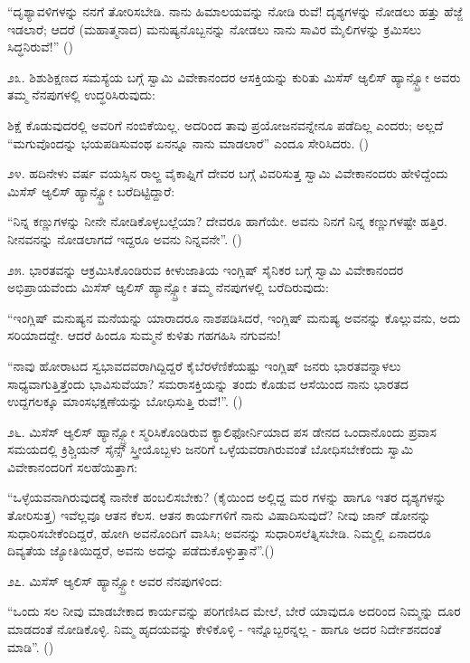 “ದೃಶ್ಯಾವಳಿಗಳನ್ನು ನನಗೆ ತೋರಿಸಬೇಡಿ. ನಾನು ಹಿಮಾಲಯವನ್ನು ನೋಡಿ ರುವೆ! ದೃಶ್ಯಗಳನ್ನು ನೋಡಲು ಹತ್ತು ಹೆಜ್ಜೆ ಇಡಲಾರೆ; ಆದರೆ (ಮಹಾತ್ಮನಾದ) ಮನುಷ್ಯನೊಬ್ಬನನ್ನು ನೋಡಲು ನಾನು ಸಾವಿರ ಮೈಲಿಗಳನ್ನು ಕ್ರಮಿಸಲು ಸಿದ್ಧನಿರುವೆ!” ()

೨೩. ಶಿಶುಶಿಕ್ಷಣದ ಸಮಸ್ಯೆಯ ಬಗ್ಗೆ ಸ್ವಾಮಿ ವಿವೇಕಾನಂದರ ಆಸಕ್ತಿಯನ್ನು ಕುರಿತು ಮಿಸೆಸ್ ಆ್ಯಲಿಸ್ ಹ್ಯಾನ್ಸ್ಬ್ರೋ ಅವರು ತಮ್ಮ ನೆನಪುಗಳಲ್ಲಿ ಉದ್ಧರಿಸಿರುವುದು:

ಶಿಕ್ಷೆ ಕೊಡುವುದರಲ್ಲಿ ಅವರಿಗೆ ನಂಬಿಕೆಯಿಲ್ಲ. ಅದರಿಂದ ತಾವು ಪ್ರಯೋಜನವನ್ನೇನೂ ಪಡೆದಿಲ್ಲ ಎಂದರು; ಅಲ್ಲದೆ “ಮಗುವೊಂದನ್ನು ಭಯಪಡಿಸುವಂಥ ಏನನ್ನೂ ನಾನು ಮಾಡಲಾರೆ” ಎಂದೂ ಸೇರಿಸಿದರು. ()

೨೪. ಹದಿನೇಳು ವರ್ಷ ವಯಸ್ಸಿನ ರಾಲ್ಙ ವೈಕಾಫ್ನಿಗೆ ದೇವರ ಬಗ್ಗೆ ವಿವರಿಸುತ್ತ ಸ್ವಾಮಿ ವಿವೇಕಾನಂದರು ಹೇಳಿದ್ದೆಂದು ಮಿಸೆಸ್ ಆ್ಯಲಿಸ್ ಹ್ಯಾನ್ಸ್ಬ್ರೋ ಬರೆದಿಟ್ಟಿದ್ದಾರೆ:

“ನಿನ್ನ ಕಣ್ಣುಗಳನ್ನು ನೀನೇ ನೋಡಿಕೊಳ್ಳಬಲ್ಲೆಯಾ? ದೇವರೂ ಹಾಗೆಯೇ. ಅವನು ನಿನಗೆ ನಿನ್ನ ಕಣ್ಣುಗಳಷ್ಟೇ ಹತ್ತಿರ. ನೀನವನನ್ನು ನೋಡಲಾಗದೆ ಇದ್ದರೂ ಅವನು ನಿನ್ನವನೇ”. ()

೨೫. ಭಾರತವನ್ನು ಆಕ್ರಮಿಸಿಕೊಂಡಿರುವ ಕೀಳುಜಾತಿಯ ಇಂಗ್ಲಿಷ್ ಸೈನಿಕರ ಬಗ್ಗೆ ಸ್ವಾಮಿ ವಿವೇಕಾನಂದರ ಅಭಿಪ್ರಾಯವೆಂದು ಮಿಸೆಸ್ ಆ್ಯಲಿಸ್ ಹ್ಯಾನ್ಸ್ಬ್ರೋ ತಮ್ಮ ನೆನಪುಗಳಲ್ಲಿ ಬರೆದಿರುವುದು:

“ಇಂಗ್ಲಿಷ್ ಮನುಷ್ಯನ ಮನೆಯನ್ನು ಯಾರಾದರೂ ನಾಶಪಡಿಸಿದರೆ, ಇಂಗ್ಲಿಷ್ ಮನುಷ್ಯ ಅವನನ್ನು ಕೊಲ್ಲುವನು, ಅದು ಸರಿಯಾದದ್ದೇ. ಆದರೆ ಹಿಂದೂ ಸುಮ್ಮನೆ ಕುಳಿತು ಗಹಗಹಿಸಿ ನಗುವನು!

“ನಾವು ಹೋರಾಟದ ಸ್ವಭಾವದವರಾಗಿದ್ದಿದ್ದರೆ ಕೈಬೆರಳೆಣಿಕೆಯಷ್ಟು ಇಂಗ್ಲಿಷ್ ಜನರು ಭಾರತವನ್ನಾಳಲು ಸಾಧ್ಯವಾಗುತ್ತಿತ್ತೆಂದು ಭಾವಿಸುವೆಯಾ? ಸಮರಾಸಕ್ತಿಯನ್ನು ತಂದು ಕೊಡುವ ಆಸೆಯಿಂದ ನಾನು ಭಾರತದ ಉದ್ದಗಲಕ್ಕೂ ಮಾಂಸಭಕ್ಷಣೆಯನ್ನು ಬೋಧಿಸುತ್ತಿ ರುವೆ!”. ()

೨೬. ಮಿಸೆಸ್ ಆ್ಯಲಿಸ್ ಹ್ಯಾನ್ಸ್ಬ್ರೋ ಸ್ಮರಿಸಿಕೊಂಡಿರುವ ಕ್ಯಾಲಿಫೋರ್ನಿಯಾದ ಪಸ ಡೇನದ ಒಂದಾನೊಂದು ಪ್ರವಾಸ ಸಮಯದಲ್ಲಿ ಕ್ರಿಶ್ಚಿಯನ್ ಸೈನ್ಸ್ ಸ್ತ್ರೀಯೊಬ್ಬಳು ಜನರಿಗೆ ಒಳ್ಳೆಯವರಾಗಿರುವಂತೆ ಬೋಧಿಸಬೇಕೆಂದು ಸ್ವಾಮಿ ವಿವೇಕಾನಂದರಿಗೆ ಸಲಹೆಯಿತ್ತಾಗ:

“ಒಳ್ಳೆಯವನಾಗಿರುವುದಕ್ಕೆ ನಾನೇಕೆ ಹಂಬಲಿಸಬೇಕು? (ಕೈಯಿಂದ ಅಲ್ಲಿದ್ದ ಮರ ಗಳನ್ನು ಹಾಗೂ ಇತರ ದೃಶ್ಯಗಳನ್ನು ತೋರಿಸುತ್ತ) ಇವೆಲ್ಲವೂ ಆತನ ಕೆಲಸ. ಆತನ ಕಾರ್ಯಗಳಿಗೆ ನಾನು ವಿಷಾದಿಸುವುದೆ? ನೀವು ಜಾನ್ ಡೋನನ್ನು ಸುಧಾರಿಸಬೇಕೆಂದಿದ್ದರೆ, ಹೋಗಿ ಅವನೊಂದಿಗೆ ವಾಸಿಸಿ; ಅವನನ್ನು ಸುಧಾರಿಸಲೆತ್ನಿಸಬೇಡಿ. ನಿಮ್ಮಲ್ಲಿ ಏನಾದರೂ ದಿವ್ಯತೆಯ ಜ್ಯೋತಿಯಿದ್ದರೆ, ಅವನು ಅದನ್ನು ಪಡೆದುಕೊಳ್ಳುತ್ತಾನೆ”.()

೨೭. ಮಿಸೆಸ್ ಆ್ಯಲಿಸ್ ಹ್ಯಾನ್ಸ್ಬ್ರೋ ಅವರ ನೆನಪುಗಳಿಂದ:

“ಒಂದು ಸಲ ನೀವು ಮಾಡಬೇಕಾದ ಕಾರ್ಯವನ್ನು ಪರಿಗಣಿಸಿದ ಮೇಲೆ, ಬೇರೆ ಯಾವುದೂ ಅದರಿಂದ ನಿಮ್ಮನ್ನು ದೂರ ಮಾಡದಂತೆ ನೋಡಿಕೊಳ್ಳಿ. ನಿಮ್ಮ ಹೃದಯವನ್ನು ಕೇಳಿಕೊಳ್ಳಿ - ಇನ್ನೊಬ್ಬರನ್ನಲ್ಲ - ಹಾಗೂ ಅದರ ನಿರ್ದೇಶನದಂತೆ ಮಾಡಿ”. ()

